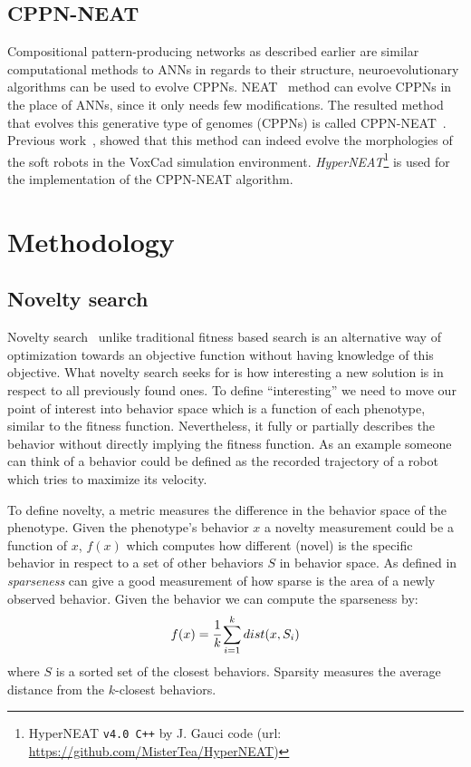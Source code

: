 \documentclass{sig-alternate}
\begin{document}
\subsection{CPPN-NEAT}

Compositional pattern-producing networks as described earlier are similar computational methods to ANNs in regards to their structure, neuroevolutionary algorithms can be used to evolve CPPNs. NEAT~\cite{stanley2002evolving} method can evolve CPPNs in the place of ANNs, since it only needs few modifications. The resulted method that evolves this generative type of genomes (CPPNs) is called CPPN-NEAT~\cite{stanley2007compositional}. Previous work~\cite{cheney2013unshackling}, showed that this method can indeed evolve the morphologies of the soft robots in the VoxCad simulation environment. \textit{HyperNEAT}\footnote{HyperNEAT \texttt{v4.0 C++}  by J. Gauci code (url: \url{https://github.com/MisterTea/HyperNEAT})} is used for the implementation of the CPPN-NEAT algorithm.

\section{Methodology}

\subsection{Novelty search}

Novelty search~\cite{lehman2008exploiting,lehman2011abandoning,lehman2010revising, risi2009novelty} unlike traditional fitness based search is an alternative way of optimization towards an objective function without having knowledge of this objective. What novelty search seeks for is how interesting a new solution is in respect to all previously found ones. To define ``interesting'' we need to move our point of interest into behavior space which is a function of each phenotype, similar to the fitness function. Nevertheless, it fully or partially describes the behavior without directly implying the fitness function. As an example someone can think of a behavior could be defined as the recorded trajectory of a robot which tries to maximize its velocity. 

To define novelty, a metric measures the difference in the behavior space of the phenotype. Given the phenotype's behavior $x$ a novelty measurement could be a function of $x$, $f(x)$ which computes how different (novel) is the specific behavior in respect to a set of other behaviors $S$ in behavior space.  As defined in~\cite{lehman2008exploiting,lehman2011abandoning} \emph{sparseness} can give a good measurement of how sparse is the area of a newly observed behavior. Given the behavior we can compute the sparseness by:
\begin{equation}
\label{sparsenessEquation}
f(x) = \cfrac{1}{k} \sum_{i=1}^{k} dist(x, S_i)
\end{equation}
where $S$ is a sorted set of the closest behaviors. Sparsity measures the average distance from the $k$-closest behaviors.
\end{document}
